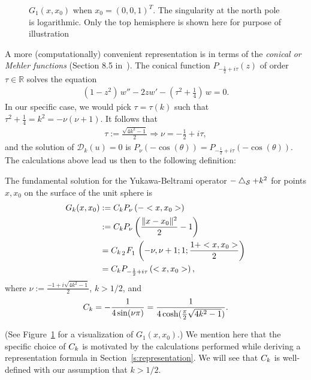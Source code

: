 \begin{figure}
  \centering
  
  \caption{\label{f:greensFun} $G_1(x,x_0)$ when $x_0=(0,0,1)^T$. The
  singularity at the north pole is logarithmic. Only the top hemisphere
  is shown here for purpose of illustration}
\end{figure}
A more (computationally) convenient representation is in terms of the
{\it conical or Mehler functions} (Section 8.5 in~\cite{lebedev}). The
conical function $P_{-\frac{1}{2}+ i \tau}(z)$ of order $\tau\in
\mathbb{R}$ solves the equation
\begin{align*}
  (1-z^2)\,w'' -2zw' - \left( \tau^2+\frac{1}{4}\right) \,w = 0.
\end{align*}
In our specific case, we would pick $\tau = \tau(k)$ such that
$\tau^2+\frac{1}{4}=k^2 = -\nu(\nu+1).$  It follows that 
\begin{align*}
  \tau:=\frac{\sqrt{4k^2-1}}{2} \Rightarrow  \nu= -\frac{1}{2}+i\tau, 
\end{align*}
and the solution of $\mathcal{D}_k(u)=0$ is $
  P_{\nu} (-\cos(\theta)) = P_{-\frac{1}{2} + i \tau} 
    (-\cos(\theta)).$
The calculations above lead us then to the following definition:

\begin{definition}
\label{fundamentaldef} 
The fundamental solution for the Yukawa-Beltrami operator $-\bigtriangleup_{\mathcal{S}} +
k^2$ for points $x,x_0$ on the surface of the unit sphere is 
\begin{subequations}
  \begin{align}
    G_k(x,x_{0})&:=\C P_{\nu}\left(-<x,x_{0}>\right) \nonumber \\
    &:=\C P_{\nu}\left(\frac{\|x-x_{0}\|^2}{2}-1\right) \label{LegP} \\
    &= \C\, \tensor[_2]{F}{_1} \left(-\nu, \nu+1; 1; 
      \frac{1+<x,x_{0}>}{2}\right)\label{hyperG} \\
    &=\C P_{-\frac{1}{2} + i \tau}
    \left(<x,x_{0}>\right) \label{conicalP},
  \end{align} 
\end{subequations}
where 
$\nu:=\frac{-1+i\sqrt{4k^2-1}}{2}$, $k>1/2$, and 
\begin{align}
  \label{constant-definition}    
  C_k=-\frac{1}{4\sin(\nu\pi)} 
    =\frac{1}{4\cosh(\frac{\pi}{2}\sqrt{4k^2-1})}.
\end{align}
\end{definition} 
(See Figure~\ref{f:greensFun} for a visualization of $G_1(x,x_0)$.) We
mention here that the specific choice of $C_k$ is motivated by the
calculations performed while deriving a representation formula in
Section~\ref{s:representation}.  We will see that $C_k$ is well-defined
with our assumption that $k>1/2$.


